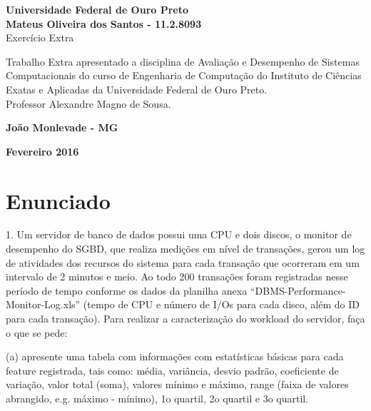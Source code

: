 \documentclass[11pt,a4paper,openany,oneside]{abntex2}
\begin{document}
	\begin{titlepage}
		\vfill
		\begin{center}
			{\large \textbf{Universidade Federal de Ouro Preto}} \\[2.5cm]
			
			  
			{\large \textbf{Mateus Oliveira dos Santos - 11.2.8093}}\\[4cm]
			
			
			{\Large Exercício Extra}\\[4cm]
			
			\hspace{.45\textwidth} %
			\begin{minipage}{.5\textwidth}
				\large Trabalho Extra apresentado a disciplina de Avaliação e Desempenho de Sistemas Computacionais do curso de Engenharia de Computação do  Instituto de Ciências Exatas e Aplicadas da  Universidade  Federal de Ouro Preto.\\[1cm]
				Professor Alexandre Magno de Sousa.
			\end{minipage}
			\vfill
			
			\vspace{2cm}
			
			\large \textbf{João Monlevade - MG}
			
			\large \textbf{Fevereiro 2016}
		\end{center}
	\end{titlepage}	
	
	
	
\chapter{Enunciado}
	
	1. Um servidor de banco de dados possui uma CPU e dois discos, o monitor de desempenho do SGBD, que realiza medições em nível de transações, gerou um log de atividades dos recursos do sistema para cada transação que ocorreram em um intervalo de 2 minutos e meio. Ao todo 200 transações foram registradas nesse período de tempo conforme os dados da planilha anexa “DBMS-Performance-Monitor-Log.xls” (tempo de CPU e número de I/Os para cada disco, além do ID para cada transação). Para realizar a caracterização do workload do servidor, faça o que se pede:
	
	(a) apresente uma tabela com informações com estatísticas básicas para cada feature registrada, tais como: média, variância, desvio padrão, coeficiente de variação, valor total (soma), valores mínimo e máximo, range (faixa de valores abrangido, e.g. máximo - mínimo), 1o quartil, 2o quartil e 3o quartil.
	
\end{document}
